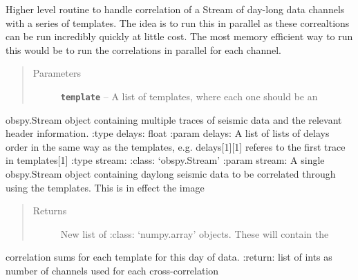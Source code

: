 \documentclass[a4paper,10pt,english]{sphinxmanual}
\begin{document}

\begin{fulllineitems}
\label{modules:match_filter._template_loop}
Higher level routine to handle correlation of a Stream of day-long data
channels with a series of templates.  The idea is to run this in parallel
as these correaltions can be run incredibly quickly at little cost.
The most memory efficient way to run this would be to run the correlations
in parallel for each channel.
\begin{quote}\begin{description}
\item[{Parameters}] \leavevmode
\textbf{\texttt{template}} -- A list of templates, where each one should be an

\end{description}\end{quote}

obspy.Stream object containing multiple traces of seismic data and the
relevant header information.
:type delays: float
:param delays: A list of lists of delays order in the same way as the
templates, e.g. delays{[}1{]}{[}1{]} referes to the first trace in templates{[}1{]}
:type stream: :class: `obspy.Stream'
:param stream: A single obspy.Stream object containing daylong seismic data
to be correlated through using the templates.  This is in effect the image
\begin{quote}\begin{description}
\item[{Returns}] \leavevmode
New list of :class: `numpy.array' objects.  These will contain the

\end{description}\end{quote}

correlation sums for each template for this day of data.
:return: list of ints as number of channels used for each cross-correlation

\end{fulllineitems}

\end{document}
